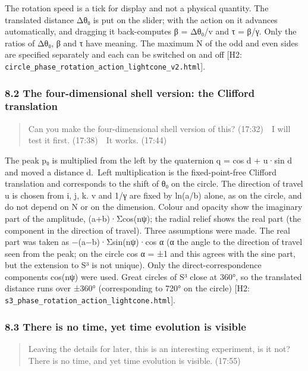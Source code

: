 \documentclass[
  a4paper,
]{article}
\begin{document}
The rotation speed is a tick for display and not a physical quantity.
The translated distance Δθ₀ is put on the slider; with the action on it
advances automatically, and dragging it back-computes β = Δθ₀/v and τ =
β/γ. Only the ratios of Δθ₀, β and τ have meaning. The maximum N of the
odd and even sides are specified separately and each can be switched on
and off {[}H2:
\texttt{circle\_\allowbreak{}phase\_\allowbreak{}rotation\_\allowbreak{}action\_\allowbreak{}lightcone\_\allowbreak{}v2.html}{]}.

\subsubsection{8.2 The four-dimensional shell version: the Clifford
translation}\label{the-four-dimensional-shell-version-the-clifford-translation}

\begin{quote}
Can you make the four-dimensional shell version of this? (17:32)　I will
test it first. (17:38)　It works. (17:44)
\end{quote}

The peak p₀ is multiplied from the left by the quaternion q = cos d +
u·sin d and moved a distance d.~Left multiplication is the
fixed-point-free Clifford translation and corresponds to the shift of θ₀
on the circle. The direction of travel u is chosen from i, j, k. v and
1/γ are fixed by ln(a/b) alone, as on the circle, and do not depend on N
or on the dimension. Colour and opacity show the imaginary part of the
amplitude, (a+b)·Σcos(nψ); the radial relief shows the real part (the
component in the direction of travel). Three assumptions were made. The
real part was taken as −(a−b)·Σsin(nψ)·cos α (α the angle to the
direction of travel seen from the peak; on the circle cos α = ±1 and
this agrees with the sine part, but the extension to S³ is not unique).
Only the direct-correspondence components cos(nψ) were used. Great
circles of S³ close at 360°, so the translated distance runs over ±360°
(corresponding to 720° on the circle) {[}H2:
\texttt{s3\_\allowbreak{}phase\_\allowbreak{}rotation\_\allowbreak{}action\_\allowbreak{}lightcone.html}{]}.

\subsubsection{8.3 There is no time, yet time evolution is
visible}\label{there-is-no-time-yet-time-evolution-is-visible}

\begin{quote}
Leaving the details for later, this is an interesting experiment, is it
not? There is no time, and yet time evolution is visible. (17:55)
\end{quote}
\end{document}
